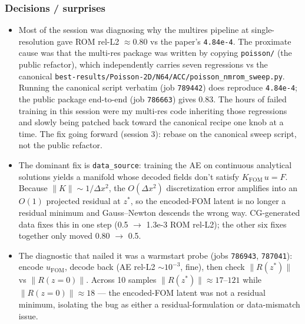 \subsubsection*{Decisions / surprises}
\begin{itemize}
  \item Most of the session was diagnosing why the multires pipeline at
        single-resolution gave ROM rel-L2 $\approx 0.80$ vs the paper's
        \texttt{4.84e-4}. The proximate cause was that the multi-res package
        was written by copying \texttt{poisson/} (the public refactor), which
        independently carries seven regressions vs the canonical
        \texttt{best-results/Poisson-2D/N64/ACC/poisson\_nmrom\_sweep.py}.
        Running the canonical script verbatim (job \texttt{789442}) does
        reproduce \texttt{4.84e-4}; the public package end-to-end (job
        \texttt{786663}) gives 0.83. The hours of failed training in this
        session were my multi-res code inheriting those regressions and
        slowly being patched back toward the canonical recipe one knob at a
        time. The fix going forward (session 3): rebase on the canonical
        sweep script, not the public refactor.
  \item The dominant fix is \texttt{data\_source}: training the AE on
        continuous analytical solutions yields a manifold whose decoded
        fields don't satisfy $K_{\text{FOM}}\,u = F$. Because $\|K\|\sim 1/\Delta x^2$,
        the $O(\Delta x^2)$ discretization error amplifies into an $O(1)$
        projected residual at $z^*$, so the encoded-FOM latent is no longer
        a residual minimum and Gauss--Newton descends the wrong way. CG-generated
        data fixes this in one step (0.5 $\rightarrow$ 1.3e-3 ROM rel-L2);
        the other six fixes together only moved 0.80 $\rightarrow$ 0.5.
  \item The diagnostic that nailed it was a warmstart probe (jobs
        \texttt{786943}, \texttt{787041}): encode $u_{\text{FOM}}$, decode back
        (AE rel-L2 $\sim 10^{-3}$, fine), then check $\|R(z^*)\|$ vs $\|R(z{=}0)\|$.
        Across 10 samples $\|R(z^*)\|\approx 17$--$121$ while $\|R(z{=}0)\|\approx 18$
        --- the encoded-FOM latent was not a residual minimum, isolating the
        bug as either a residual-formulation or data-mismatch issue.
\end{itemize}

